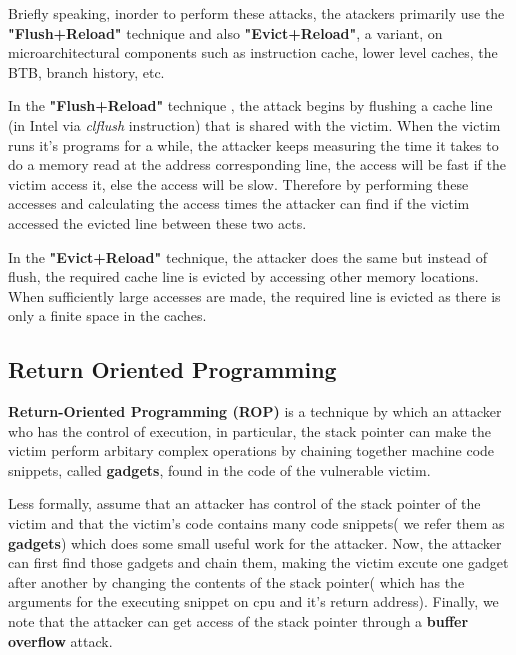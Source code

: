 \documentclass[12pt]{article}
\begin{document}
\begin{appendices}
	Briefly speaking, inorder to perform these attacks, the atackers primarily use the \textbf{"Flush+Reload"}
	technique and also \textbf{"Evict+Reload"}, a variant, on microarchitectural components such as instruction cache, lower level caches, the BTB, branch history, etc. 
	
	In the \textbf{"Flush+Reload"} technique , the attack begins by flushing a cache line (in Intel via \textit{clflush} instruction) that is shared with the victim. When the victim runs it's programs for a while, the attacker keeps measuring the time it takes to do a memory read at the address corresponding line, the access will be fast if the victim access it, else the access will be slow. Therefore by performing these accesses and calculating the access times the attacker can find if the victim accessed the evicted line between these two acts.
	
	In the \textbf{"Evict+Reload"} technique, the attacker does the same but instead of flush, the required cache line is evicted by accessing other memory locations. When sufficiently large accesses are made, the required line is evicted as there is only a finite space in the caches.
	
	\subsection{Return Oriented Programming}
	\textbf{Return-Oriented Programming (ROP)} is a technique by which an attacker who has the control of execution, in particular, the stack pointer can make the victim perform arbitary complex operations by chaining together machine code snippets, called \textbf{gadgets}, found in the code of the vulnerable victim.
	
	Less formally, assume that an attacker has control of the stack pointer of the victim and that the  victim's code contains many code snippets( we refer them as \textbf{gadgets}) which does some small useful work for the attacker. Now, the attacker can first find those gadgets and chain them, making the victim excute one gadget after another by changing the contents of the stack pointer( which has the arguments for the executing snippet on cpu and it's return address). Finally, we note that the attacker can get access of the stack pointer through a  \textbf{buffer overflow} attack.
	

\end{appendices}
\end{document}
